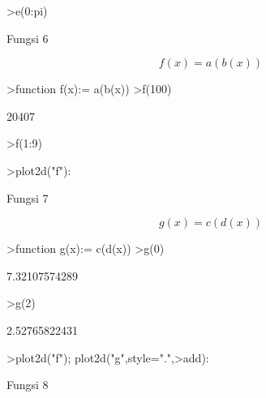 \documentclass[12pt,arial,letterpaper]{book}
\begin{document}
\begin{eulercomment}
\begin{eulercomment}
\begin{eulercomment}
\begin{eulercomment}
\begin{eulercomment}
\begin{eulercomment}
\begin{eulercomment}
\begin{eulercomment}
\begin{eulercomment}
\begin{eulercomment}
\begin{eulercomment}
\begin{eulercomment}
\begin{eulercomment}
\begin{eulercomment}
\begin{eulercomment}
\begin{eulercomment}
\begin{eulercomment}
\begin{eulercomment}
\begin{eulerprompt}
>e(0:pi)
\end{eulerprompt}
\begin{euleroutput}
  [-2,  -1.15853,  -1.0907,  -1.85888]
\end{euleroutput}
\begin{eulercomment}
Fungsi 6\\
\end{eulercomment}
\begin{eulerformula}
\[
f(x)=a(b(x))
\]
\end{eulerformula}
\begin{eulerprompt}
>function f(x):= a(b(x)) 
>f(100)
\end{eulerprompt}
\begin{euleroutput}
  20407
\end{euleroutput}
\begin{eulerprompt}
>f(1:9)
\end{eulerprompt}
\begin{euleroutput}
  [13,  23,  37,  55,  77,  103,  133,  167,  205]
\end{euleroutput}
\begin{eulerprompt}
>plot2d("f"):
\end{eulerprompt}
\begin{eulercomment}
Fungsi 7\\
\end{eulercomment}
\begin{eulerformula}
\[
g(x)=c(d(x))
\]
\end{eulerformula}
\begin{eulerprompt}
>function g(x):= c(d(x)) 
>g(0)
\end{eulerprompt}
\begin{euleroutput}
  7.32107574289
\end{euleroutput}
\begin{eulerprompt}
>g(2)
\end{eulerprompt}
\begin{euleroutput}
  2.52765822431
\end{euleroutput}
\begin{eulerprompt}
>plot2d("f"); plot2d("g",style=".",>add):
\end{eulerprompt}
\begin{eulercomment}
Fungsi 8\\

\end{eulercomment}
\end{eulercomment}
\end{eulercomment}
\end{eulercomment}
\end{eulercomment}
\end{eulercomment}
\end{eulercomment}
\end{eulercomment}
\end{eulercomment}
\end{eulercomment}
\end{eulercomment}
\end{eulercomment}
\end{eulercomment}
\end{eulercomment}
\end{eulercomment}
\end{eulercomment}
\end{eulercomment}
\end{eulercomment}
\end{eulercomment}
\end{document}
